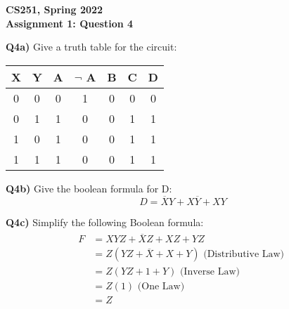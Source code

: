 \documentclass[12pt]{article}
\begin{document}
\begin{center}
{\Large\textbf{CS251, Spring 2022}}\\
\vspace{2mm}
{\Large\textbf{Assignment 1: Question 4}}\\
\vspace{3mm}
\end{center}
\textbf{Q4a)} Give a truth table for the circuit: 

\begin{center}
\begin{tabular}{||c c | c | c | c | c | c |||} 
 \hline
 X & Y & A & $\neg$ A & B & C & D \\ [0.5ex] 
 \hline\hline
 0 & 0 & 0 & 1 & 0 & 0 & 0 \\ 
 \hline
 0 & 1 & 1 & 0 & 0 & 1 & 1 \\
 \hline
 1 & 0 & 1 & 0 & 0 & 1 & 1 \\
 \hline
 1 & 1 & 1 & 0 & 0 & 1 & 1 \\ [1ex] 
 \hline
\end{tabular}
\end{center}

\begin{adjustwidth}{0em}{0pt}
\textbf{Q4b)} Give the boolean formula for D:
\[ D = \overline{X}Y + X\overline{Y} + XY \]
\end{adjustwidth}
\begin{adjustwidth}{0em}{0pt}
\textbf{Q4c)} Simplify the following Boolean formula:
\begin{align*}
    \begin{aligned}
       F &= XYZ + \overline{X}Z + XZ + YZ \\
         &= Z( YZ + \overline{X} + X + Y) \text{ (Distributive Law) } \\
         &= Z( YZ + 1 + Y)                \text{ (Inverse Law) }\\
         &= Z(1)                \text{ (One Law) } \\
         &= Z
    \end{aligned}
\end{align*}
\end{adjustwidth}
\end{document}
